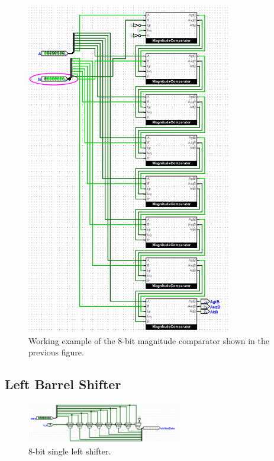 \documentclass{article}
\begin{document}
\begin{figure}[H]
    \centering
    \includegraphics[width=0.8\textwidth]{./images/working_8-bit_comparator.png}
    \caption{Working example of the 8-bit magnitude comparator shown in the previous figure.}
\end{figure}

\subsection*{Left Barrel Shifter}

\begin{figure}[H]
    \centering
    \includegraphics[width=0.6\textwidth]{./images/8-bit_single_left_sh.png}
    \caption{8-bit single left shifter.}
\end{figure}
\end{document}
